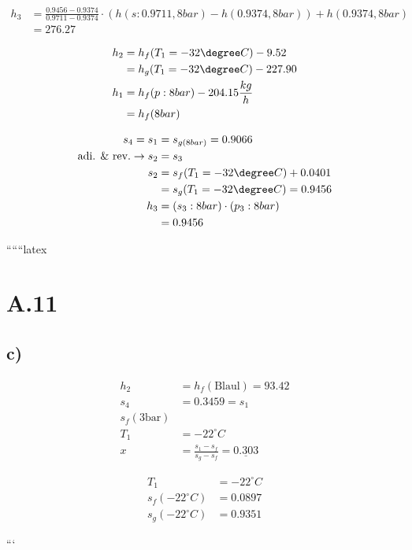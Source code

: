 \begin{itemize}
    \begin{align*}
    h_3 &= \frac{0.9456 - 0.9374}{0.9711 - 0.9374} \cdot (h(s: 0.9711, 8bar) - h(0.9374, 8bar)) + h(0.9374, 8bar) \\
    &= 276.27
    \end{align*}
    
    \begin{align*}
    h_2 &= h_f(T_1 = -32 \degree C) - 9.52 \\
    &= h_g(T_1 = -32 \degree C) - 227.90 \\
    h_1 &= h_f(p: 8bar) - 204.15 \frac{kg}{h} \\
    &= h_f(8bar)
    \end{align*}
    
    \begin{align*}
    s_4 = s_1 &= s_{g(8bar)} = 0.9066 \\
    \text{adi. \& rev.} \rightarrow s_2 &= s_3 \\
    s_2 &= s_f(T_1 = -32 \degree C) + 0.0401 \\
    &= s_g(T_1 = -32 \degree C) = 0.9456 \\
    h_3 &= (s_3: 8bar) \cdot (p_3: 8bar) \\
    &= 0.9456
    \end{align*}
\end{itemize}

``````latex

\section*{A.11}

\subsection*{c)}

\begin{align*}
h_2 &= h_f(\text{Blaul}) = 93.42 \\
s_4 &= 0.3459 = s_1 \\
s_f(\text{3bar}) \\
T_1 &= -22^\circ C \\
x &= \frac{s_1 - s_f}{s_g - s_f} = \underline{0.303}
\end{align*}

\begin{align*}
T_1 &= -22^\circ C \\
s_f(-22^\circ C) &= 0.0897 \\
s_g(-22^\circ C) &= 0.9351
\end{align*}

```